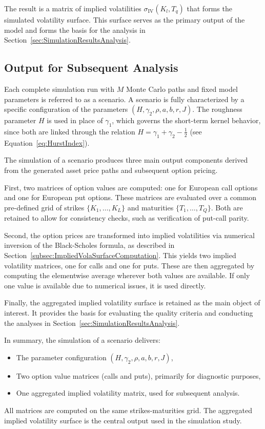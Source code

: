 The result is a matrix of implied volatilities $\sigma_{\text{IV}}(K_l,T_q)$ that forms the simulated volatility surface. This surface serves as the primary output of the model and forms the basis for the analysis in Section~\ref{sec:SimulationResultsAnalysis}.


\subsection{Output for Subsequent Analysis} \label{subsec:OutputSubsequentAnalysis}

Each complete simulation run with $M$ Monte Carlo paths and fixed model parameters is referred to as a scenario. A scenario is fully characterized by a specific configuration of the parameters $(H, \gamma_2, \rho, a, b, r, J)$. The roughness parameter $H$ is used in place of $\gamma_1$, which governs the short-term kernel behavior, since both are linked through the relation $H = \gamma_1 + \gamma_2 - \tfrac{1}{2}$ (see Equation~\eqref{eq:HurstIndex}).

The simulation of a scenario produces three main output components derived from the generated asset price paths and subsequent option pricing.

First, two matrices of option values are computed: one for European call options and one for European put options. These matrices are evaluated over a common pre-defined grid of strikes $\{K_1, \ldots, K_L\}$ and maturities $\{T_1, \ldots, T_Q\}$. Both are retained to allow for consistency checks, such as verification of put-call parity.

Second, the option prices are transformed into implied volatilities via numerical inversion of the Black-Scholes formula, as described in Section~\ref{subsec:ImpliedVolaSurfaceComputation}. This yields two implied volatility matrices, one for calls and one for puts. These are then aggregated by computing the elementwise average wherever both values are available. If only one value is available due to numerical issues, it is used directly.

Finally, the aggregated implied volatility surface is retained as the main object of interest. It provides the basis for evaluating the quality criteria and conducting the analyses in Section~\ref{sec:SimulationResultsAnalysis}.

In summary, the simulation of a scenario delivers:
\begin{itemize}
    \item The parameter configuration $(H, \gamma_2, \rho, a, b, r, J)$,
    \item Two option value matrices (calls and puts), primarily for diagnostic purposes,
    \item One aggregated implied volatility matrix, used for subsequent analysis.
\end{itemize}

All matrices are computed on the same strikes-maturities grid. The aggregated implied volatility surface is the central output used in the simulation study.